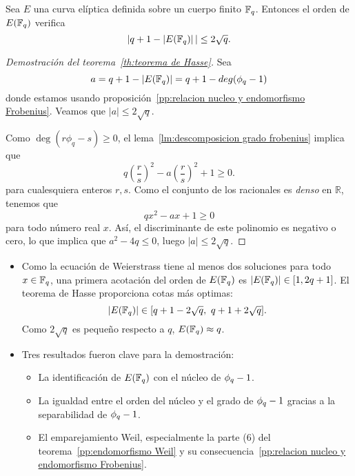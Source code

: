 \begin{teorema2}[\ref{th:teorema de Hasse}]
	Sea $E$ una curva elíptica definida sobre un cuerpo finito $\mathbb{F}_q$. Entonces el orden de $E(\mathbb{F}_q)$ verifica
	$$
		|q + 1 - \left\vert{E(\mathbb{F}_{q})}\right\vert| \le 2 \sqrt{q}.
	$$
\end{teorema2}
\begin{proof}[Demostración del teorema~\ref{th:teorema de Hasse}]
Sea
$$
	a = q + 1 - \left\vert{E(\mathbb{F}_{q})}\right\vert = q + 1 - deg(\phi_q - 1)
$$
donde estamos usando proposición~\ref{pp:relacion nucleo y endomorfismo Frobenius}. Veamos que $|a| \le 2 \sqrt{q}$.

Como $\deg(r \phi_q - s) \ge 0$, el lema~\ref{lm:descomposicion grado frobenius} implica que
$$
q \left( \frac{r}{s} \right)^2 - a \left(\frac{r}{s} \right) ^2 + 1 \ge 0.
$$
para cualesquiera enteros $r, s$. Como el conjunto de los racionales es \emph{denso} en $\mathbb{R}$, tenemos que
$$
q x^2 - a x + 1 \ge 0
$$
para todo número real $x$. Así, el discriminante de este polinomio es negativo o cero, lo que implica que $a^2 - 4 q \le 0$, luego $| a | \le 2 \sqrt{q}$.
\end{proof}

\begin{nota}\leavevmode
	\begin{itemize}
		\item Como la ecuación de Weierstrass tiene al menos dos soluciones para todo $x \in \mathbb{F}_q$, una primera acotación del orden de $E(\mathbb{F}_q)$ es  $\left\vert{E(\mathbb{F}_{q})}\right\vert \in [1, 2 q + 1]$. El teorema de Hasse proporciona cotas más optimas:
		$$
		\left\vert{E(\mathbb{F}_{q})}\right\vert \in [q + 1 - 2 \sqrt{q}, \ q + 1 + 2 \sqrt{q}].
		$$
		Como $2\sqrt{q}$ es pequeño respecto a $q$, $E(\mathbb{F}_q) \approx q$.
		\item Tres resultados fueron clave para la demostración:
			\begin{itemize}
				\item La identificación de $E(\mathbb{F}_q)$ con el núcleo de $\phi_q - 1$.
				\item La igualdad entre el orden del núcleo y el grado de $\phi_q - 1$ gracias a la separabilidad de $\phi_q - 1$.
				\item El emparejamiento Weil, especialmente la parte (6) del teorema~\ref{pp:endomorfismo Weil} y su consecuencia~\ref{pp:relacion nucleo y endomorfismo Frobenius}.
			\end{itemize}
	\end{itemize}
\end{nota}

